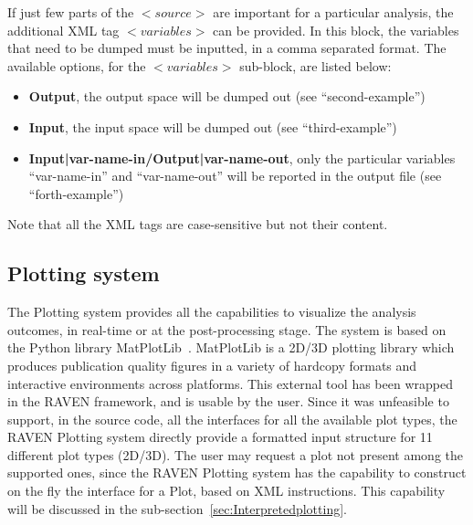 If just few parts of the $<source>$ are important for a particular analysis, the additional XML tag $<variables>$ can be provided. In this block, the variables that need to be dumped must be inputted, in a comma separated format. The available options, for the $<variables>$ sub-block, are listed below:
\vspace{-5mm}
\begin{itemize}
\itemsep0em
\item \textbf{Output}, the output space will be dumped out (see ``second-example'')
\item \textbf{Input}, the input space will be dumped out (see ``third-example'')
\item \textbf{Input|var-name-in/Output|var-name-out}, only the particular variables ``var-name-in'' and ``var-name-out'' will be reported in the output file (see ``forth-example'')
\end{itemize}
\vspace{-5mm}
Note that all the XML tags are case-sensitive but not their content. 
%
%
\subsection{Plotting system \label{sec:plotting}}
The Plotting system provides all the capabilities to visualize the analysis outcomes, in real-time or at the post-processing stage. The system is based on the  Python library MatPlotLib~\cite{MatPlotLib}. MatPlotLib is a  2D/3D plotting library which produces publication quality figures in a variety of hardcopy formats and interactive environments across platforms. This external tool has been wrapped in the RAVEN framework, and is usable by the user. Since it was unfeasible to support, in the source code, all the interfaces for all the available plot types, the RAVEN Plotting system directly provide a formatted input structure for 11 different plot types (2D/3D). The user may request a plot not present among the supported ones, since the RAVEN Plotting system has the capability to construct on the fly the interface for a Plot, based on XML instructions. This capability will be discussed in the sub-section~\ref{sec:Interpretedplotting}.

